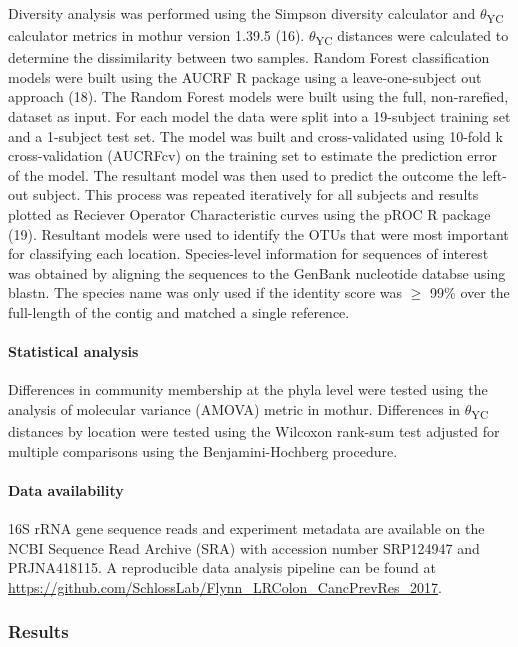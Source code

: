 \documentclass[12pt,]{article}
\let\oldparagraph\paragraph
\renewcommand{\paragraph}[1]{\oldparagraph{#1}\mbox{}}
\begin{document}
Diversity analysis was performed using the Simpson diversity calculator
and \(\theta\)\textsubscript{YC} calculator metrics in mothur version
1.39.5 (16). \(\theta\)\textsubscript{YC} distances were calculated to
determine the dissimilarity between two samples. Random Forest
classification models were built using the AUCRF R package using a
leave-one-subject out approach (18). The Random Forest models were built
using the full, non-rarefied, dataset as input. For each model the data
were split into a 19-subject training set and a 1-subject test set. The
model was built and cross-validated using 10-fold k cross-validation
(AUCRFcv) on the training set to estimate the prediction error of the
model. The resultant model was then used to predict the outcome the
left-out subject. This process was repeated iteratively for all subjects
and results plotted as Reciever Operator Characteristic curves using the
pROC R package (19). Resultant models were used to identify the OTUs
that were most important for classifying each location. Species-level
information for sequences of interest was obtained by aligning the
sequences to the GenBank nucleotide databse using blastn. The species
name was only used if the identity score was \(\ge\) 99\% over the
full-length of the contig and matched a single reference.

\paragraph{Statistical analysis}\label{statistical-analysis}

Differences in community membership at the phyla level were tested using
the analysis of molecular variance (AMOVA) metric in mothur. Differences
in \(\theta\)\textsubscript{YC} distances by location were tested using
the Wilcoxon rank-sum test adjusted for multiple comparisons using the
Benjamini-Hochberg procedure.

\paragraph{Data availability}\label{data-availability}

16S rRNA gene sequence reads and experiment metadata are available on
the NCBI Sequence Read Archive (SRA) with accession number SRP124947 and
PRJNA418115. A reproducible data analysis pipeline can be found at
\url{https://github.com/SchlossLab/Flynn_LRColon_CancPrevRes_2017}.

\subsubsection{Results}\label{results}
\end{document}
